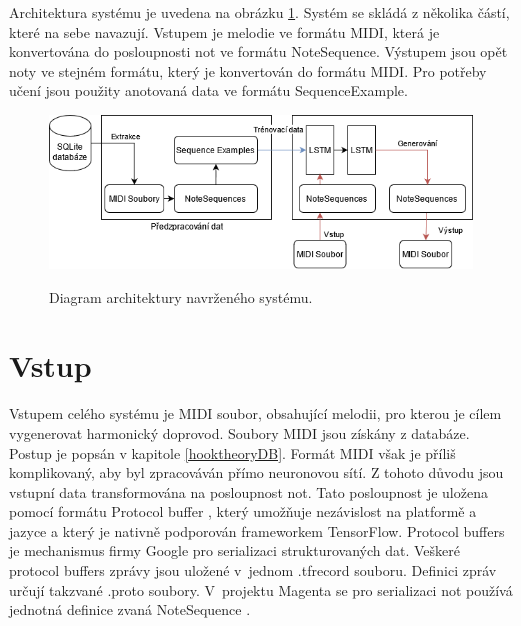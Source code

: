 Architektura systému je uvedena na obrázku \ref{obrazekArchitekturaSystemu}.
Systém se skládá z několika částí, 
které na sebe navazují.
Vstupem je melodie ve formátu MIDI,
která je konvertována do posloupnosti not ve formátu NoteSequence.
Výstupem jsou opět noty ve stejném formátu,
který je konvertován do formátu MIDI.
Pro potřeby učení jsou použity anotovaná data ve formátu SequenceExample.
\begin{figure}[h]\centering
    \centering
    \includegraphics[width=1\linewidth]{obrazky/SystemArchitecture.png}\\[1pt]  
    \caption{Diagram architektury navrženého systému.}    
    \label{obrazekArchitekturaSystemu}
\end{figure}

\section{Vstup}
Vstupem celého systému je MIDI soubor, obsahující melodii,
pro kterou je cílem vygenerovat harmonický doprovod.
Soubory MIDI jsou získány z databáze.
Postup je popsán v kapitole \ref{hooktheoryDB}.
Formát MIDI však je příliš komplikovaný, 
aby byl zpracováván přímo neuronovou sítí. 
Z tohoto důvodu jsou vstupní data transformována 
na posloupnost not.
Tato posloupnost je uložena pomocí formátu Protocol buffer \cite{google_ProtocolBuffers},
který umožňuje nezávislost na platformě a jazyce 
a který je nativně podporován frameworkem TensorFlow.
Protocol buffers je mechanismus firmy Google pro serializaci strukturovaných dat.
Veškeré protocol buffers zprávy jsou uložené v~jednom .tfrecord souboru.
Definici zpráv určují takzvané .proto soubory.
V~projektu Magenta se pro serializaci not používá jednotná definice zvaná NoteSequence
\cite{google_musicColab}.
\par

